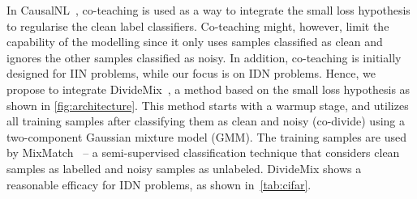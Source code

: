 \documentclass[10pt,twocolumn,letterpaper]{article}
\begin{document}
    In CausalNL~\cite{yao2021instance}, co-teaching is used as a way to integrate the small loss hypothesis to regularise the clean label classifiers. Co-teaching might, however, limit the capability of the modelling since it only uses samples classified as clean and ignores the other samples classified as noisy. In addition, co-teaching is initially designed for IIN problems, while our focus is on IDN problems. Hence, we propose to integrate DivideMix~\cite{li2020dividemix}, a method based on the small loss hypothesis as shown in \cref{fig:architecture}. This method starts with a warmup stage, and utilizes all training samples after classifying them as clean and noisy (co-divide) using a two-component Gaussian mixture model (GMM). The training samples are used by MixMatch~\cite{berthelot2019mixmatch} -- a semi-supervised classification technique that considers clean samples as labelled and noisy samples as unlabeled.
    DivideMix shows a reasonable efficacy for IDN problems, as shown in~\cref{tab:cifar}.
\end{document}
